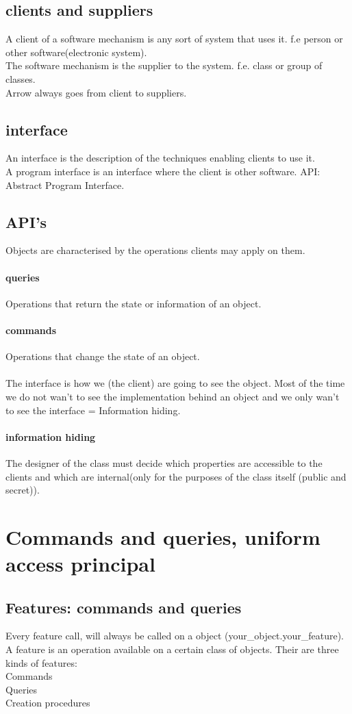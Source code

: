 \documentclass[11pt]{article}
\begin{document}
\subsection{clients and suppliers}
A client of a software mechanism is any sort of system that uses it. f.e person or other software(electronic system).
\\ The software mechanism is the supplier to the system. f.e. class or group of classes.
\\ Arrow always goes from client to suppliers.
\subsection{interface}
An interface is the description of the techniques enabling clients to use it.\\
A program interface is an interface where the client is other software. API: Abstract Program Interface. 
\subsection{API's}
Objects are characterised by the operations clients may apply on them.
\paragraph{queries}
Operations that return the state or information of an object.
\paragraph{commands}
Operations that change the state of an object.
\\\\ The interface is how we (the client) are going to see the object.
Most of the time we do not wan't to see the implementation behind an object and we only wan't to see the interface = Information hiding.
\paragraph{information hiding}
The designer of the class must decide which properties are accessible to the clients and which are internal(only for the purposes of the class itself (public and secret)).
\section{Commands and queries, uniform access principal}
\subsection{Features: commands and queries}
Every feature call, will always be called on a object (your\_object.your\_feature). A feature is an operation available on a certain class of objects. Their are three kinds of features:
	\\Commands\\Queries\\Creation procedures
\end{document}
